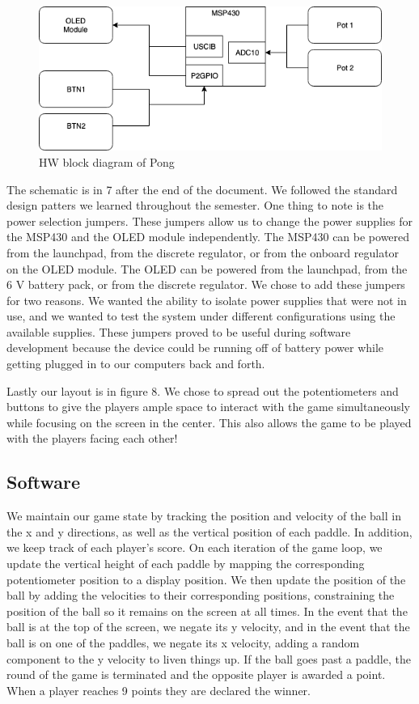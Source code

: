 \documentclass{article}
\begin{document}
\begin{figure}[h!]
    \centering
    \includegraphics[width=\textwidth]{diag.png}
    \caption{HW block diagram of Pong}
    \label{fig:my_label}
\end{figure}

The schematic is in 7 after the end of the document. We followed the standard design patters we learned throughout the semester. One thing to note is the power selection jumpers. These jumpers allow us to change the power supplies for the MSP430 and the OLED module independently. The MSP430 can be powered from the launchpad, from the discrete regulator, or from the onboard regulator on the OLED module. The OLED can be powered from the launchpad, from the 6 V battery pack, or from the discrete regulator. We chose to add these jumpers for two reasons. We wanted the ability to isolate power supplies that were not in use, and we wanted to test the system under different configurations using the available supplies.
These jumpers proved to be useful during software development because the device could be running off of battery power while getting plugged in to our computers back and forth. 

Lastly our layout is in figure 8. We chose to spread out the potentiometers and buttons to give the players ample space to interact with the game simultaneously while focusing on the screen in the center. This also allows the game to be played with the players facing each other!

\subsection{Software}
We maintain our game state by tracking the position and velocity of the ball in the x and y directions, as well as the vertical position
of each paddle. In addition, we keep track of each player's score. On each iteration of the game loop, we update the vertical
height of each paddle by mapping the corresponding potentiometer position to a display position. We then update the position of
the ball by adding the velocities
to their corresponding positions, constraining the position of the ball so it remains on the screen at all times. In the
event that the ball is at the top of the screen, we negate its y velocity, and in the event that the ball is on one of the paddles, we negate
its x velocity, adding a random component to the y velocity to liven things up. If the ball goes past a paddle,
the round of the game is terminated and the opposite player is awarded a point. When a player reaches 9 points they are declared the winner.
\end{document}
